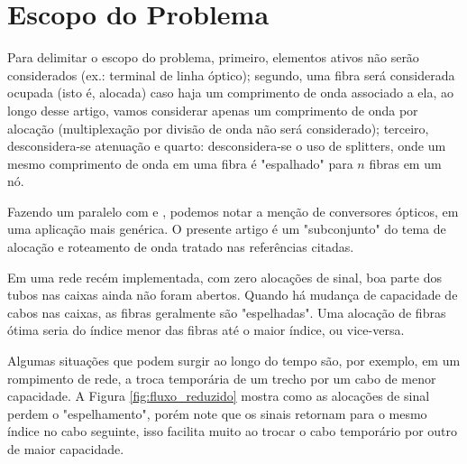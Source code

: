 \section{Escopo do Problema} \label{sec:problem}

Para delimitar o escopo do problema, primeiro, elementos ativos não serão
considerados (ex.: terminal de linha óptico); segundo, uma fibra será
considerada ocupada (isto é, alocada) caso haja um comprimento de onda
associado a ela, ao longo desse artigo, vamos considerar apenas um comprimento
de onda por alocação (multiplexação por divisão de onda não será considerado);
terceiro, desconsidera-se atenuação e quarto: desconsidera-se o uso de
splitters, onde um mesmo comprimento de onda em uma fibra é "espalhado" para
$n$ fibras em um nó.

Fazendo um paralelo com \cite{artigorwa} e \cite{zang2000review}, podemos notar
a menção de conversores ópticos, em uma aplicação mais genérica. O presente
artigo é um "subconjunto" do tema de alocação e roteamento de onda tratado nas
referências citadas.

Em uma rede recém implementada, com zero alocações de sinal, boa parte dos tubos 
nas caixas ainda não foram abertos. Quando há mudança de capacidade de cabos nas
caixas, as fibras geralmente são "espelhadas". Uma alocação de fibras ótima
seria do índice menor das fibras até o maior índice, ou vice-versa.

Algumas situações que podem surgir ao longo do tempo são, por exemplo, em um
rompimento de rede, a troca temporária de um trecho por um cabo de menor 
capacidade. A Figura \ref{fig:fluxo_reduzido} mostra como as alocações de sinal
perdem o "espelhamento", porém note que os sinais retornam para o mesmo índice
no cabo seguinte, isso facilita muito ao trocar o cabo temporário por outro de
maior capacidade.

